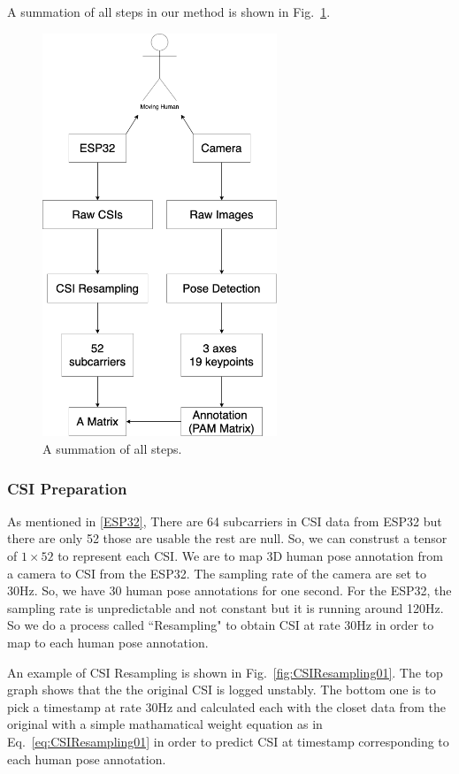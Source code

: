 \documentclass[conference]{IEEEtran}
\begin{document}
		A summation of all steps in our method is shown in Fig.~\ref{fig:STEP02}. 
	
	
	\begin{figure}[htbp]
		\centerline{\includegraphics[width=70mm,scale=0.5]{STEP03.png}}
		\caption{A summation of all steps.}
		\label{fig:STEP02}
	\end{figure}
	
	\subsubsection{CSI Preparation}
	
		
	As mentioned in \ref{ESP32}, There are 64 subcarriers in CSI data from ESP32 but there are only 52 those are usable the rest are null. So, we can construst a tensor of $1 \times 52$ to represent each CSI. We are to map 3D human pose annotation from a camera to CSI from the ESP32. The sampling rate of the camera are set to 30Hz. So, we have 30 human pose annotations for one second. For the ESP32, the sampling rate is unpredictable and not constant but it is running around 120Hz. So we do a process called ``Resampling" to obtain CSI at rate 30Hz in order to map to each human pose annotation.
	
	An example of CSI Resampling is shown in Fig.~\ref{fig:CSIResampling01}. The top graph shows that the the original CSI is logged unstably. The bottom one is to pick a timestamp at rate 30Hz and calculated each with the closet data from the original with a simple mathamatical weight equation as in Eq.~\ref{eq:CSIResampling01} in order to predict CSI at timestamp corresponding to each human pose annotation.
	
\end{document}
